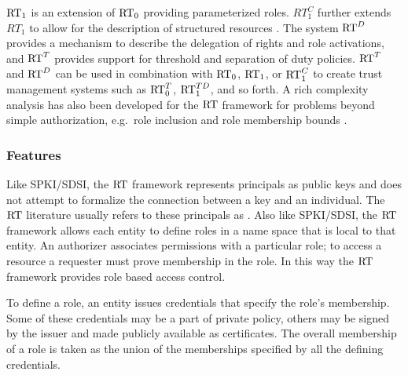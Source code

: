 $\text{RT}_1$ is an extension of $\text{RT}_0$ providing parameterized roles. $RT_1^C$
further extends $RT_1$ to allow for the description of structured resources
\cite{Li:DCFTML,Li:RRBTMF}. The system $\text{RT}^D$ provides a mechanism to
describe the delegation of rights and role activations, and $\text{RT}^T$ provides
support for threshold and separation of duty policies. $\text{RT}^T$ and $\text{RT}^D$ can
be used in combination with $\text{RT}_0$, $\text{RT}_1$, or $\text{RT}_1^C$ to create trust
management systems such as $\text{RT}_0^T$, $\text{RT}_1^{TD}$, and so forth. A rich
complexity analysis has also been developed for the $\text{RT}$ framework for
problems beyond simple authorization, e.g.\ role inclusion and role membership
bounds \cite{Li:BPOCSATM}.

\subsubsection{Features}

Like SPKI/SDSI, the $\text{RT}$ framework represents principals as public keys
and does not attempt to formalize the connection between a key and an
individual. The $\text{RT}$ literature usually refers to these principals as
. Also like SPKI/SDSI, the $\text{RT}$ framework allows each
entity to define roles in a name space that is local to that entity. An
authorizer associates permissions with a particular role; to access a
resource a requester must prove membership in the role. In this way the
$\text{RT}$ framework provides role based access control.

To define a role, an entity issues credentials that specify the role's
membership. Some of these credentials may be a part of private policy,
others may be signed by the issuer and made publicly available as
certificates. The overall membership of a role is taken as the union
of the memberships specified by all the defining credentials.

